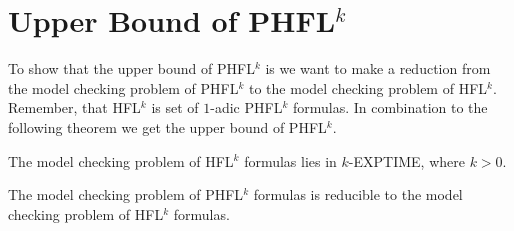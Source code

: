 \section{Upper Bound of PHFL$^k$}
\label{sec:phfl_k_equals_k_exptime_upper_bounds}
To show that the upper bound of PHFL$^k$ is  we want to make a reduction from the model checking
problem of PHFL$^k$ to the model checking problem of HFL$^k$. Remember, that HFL$^k$ is set of $1$-adic PHFL$^k$
formulas. In combination to the following theorem we get the upper bound of PHFL$^k$.

\begin{theorem}{\cite{axelsson2007complexity}}
    \label{theorem:hfl_k_in_k_exptime}
    The model checking problem of HFL$^k$ formulas lies in $k$-EXPTIME, where $k > 0$.
\end{theorem}

\begin{lemma}
    \label{lemma:model_check_phfl_k}
    The model checking problem of PHFL$^k$ formulas is reducible to the model checking problem of HFL$^k$ formulas.
\end{lemma}


